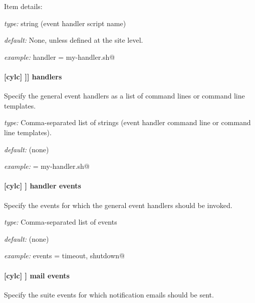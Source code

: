 Item details:
\begin{myitemize}
    \item {\em type:} string (event handler script name)
    \item {\em default:} None, unless defined at the site level.
    \item {\em example:} \lstinline@startup handler = my-handler.sh@
\end{myitemize}

\paragraph[handlers]{[cylc] \textrightarrow [[[events]]] \textrightarrow handlers}

Specify the general event handlers as a list of command lines or command line
templates.

\begin{myitemize}
    \item {\em type:} Comma-separated list of strings (event handler command line or command line templates).
    \item {\em default:} (none)
    \item {\em example:} \lstinline@handlers = my-handler.sh@
\end{myitemize}

\paragraph[handler events]{[cylc] \textrightarrow [[events]] \textrightarrow handler events}

Specify the events for which the general event handlers should be invoked.

\begin{myitemize}
    \item {\em type:} Comma-separated list of events
    \item {\em default:} (none)
    \item {\em example:} \lstinline@handler events = timeout, shutdown@
\end{myitemize}

\paragraph[mail events]{[cylc] \textrightarrow [[events]] \textrightarrow mail events}

Specify the suite events for which notification emails should be sent.

